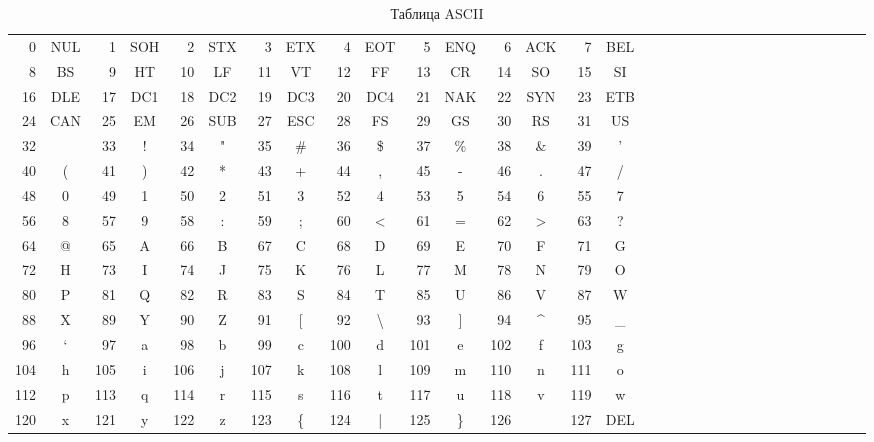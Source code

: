 \begin{table}
  \caption{Таблица ASCII} \label{tab:ascii}
  {\tiny
  \begin{tabular}{rcrcrcrcrcrcrcrcrcrcrcrcrcrcrcrc}
    0 & NUL &   1 & SOH &   2 & STX &   3 & ETX &   4 & EOT &   5 & ENQ &   6 & ACK &   7 & BEL \\
    8 &  BS &   9 &  HT &  10 &  LF &  11 &  VT &  12 &  FF &  13 &  CR &  14 &  SO &  15 &  SI \\
   16 & DLE &  17 & DC1 &  18 & DC2 &  19 & DC3 &  20 & DC4 &  21 & NAK &  22 & SYN &  23 & ETB \\
   24 & CAN &  25 &  EM &  26 & SUB &  27 & ESC &  28 &  FS &  29 &  GS &  30 &  RS &  31 &  US \\
   32 &     &  33 &  !  &  34 &  "  &  35 & \#  &  36 & \$  &  37 & \%  &  38 & \&  &  39 &  '  \\
   40 &  (  &  41 &  )  &  42 &  *  &  43 &  +  &  44 &  ,  &  45 &  -  &  46 &  .  &  47 &  /  \\
   48 &  0  &  49 &  1  &  50 &  2  &  51 &  3  &  52 &  4  &  53 &  5  &  54 &  6  &  55 &  7  \\
   56 &  8  &  57 &  9  &  58 &  :  &  59 &  ;  &  60 &  <  &  61 &  =  &  62 &  >  &  63 &  ?  \\
   64 &  @  &  65 &  A  &  66 &  B  &  67 &  C  &  68 &  D  &  69 &  E  &  70 &  F  &  71 &  G  \\
   72 &  H  &  73 &  I  &  74 &  J  &  75 &  K  &  76 &  L  &  77 &  M  &  78 &  N  &  79 &  O  \\
   80 &  P  &  81 &  Q  &  82 &  R  &  83 &  S  &  84 &  T  &  85 &  U  &  86 &  V  &  87 &  W  \\
   88 &  X  &  89 &  Y  &  90 &  Z  &  91 &  [  &  92 &  \textbackslash  &  93 &  ]  &  94 & \^  &  95 & \_  \\
   96 &  `  &  97 &  a  &  98 &  b  &  99 &  c  & 100 &  d  & 101 &  e  & 102 &  f  & 103 &  g  \\
  104 &  h  & 105 &  i  & 106 &  j  & 107 &  k  & 108 &  l  & 109 &  m  & 110 &  n  & 111 &  o  \\
  112 &  p  & 113 &  q  & 114 &  r  & 115 &  s  & 116 &  t  & 117 &  u  & 118 &  v  & 119 &  w  \\
  120 &  x  & 121 &  y  & 122 &  z  & 123 & \{  & 124 &  |  & 125 & \}  & 126 &  ~  & 127 & DEL \\
  \end{tabular}
  }
\end{table}
